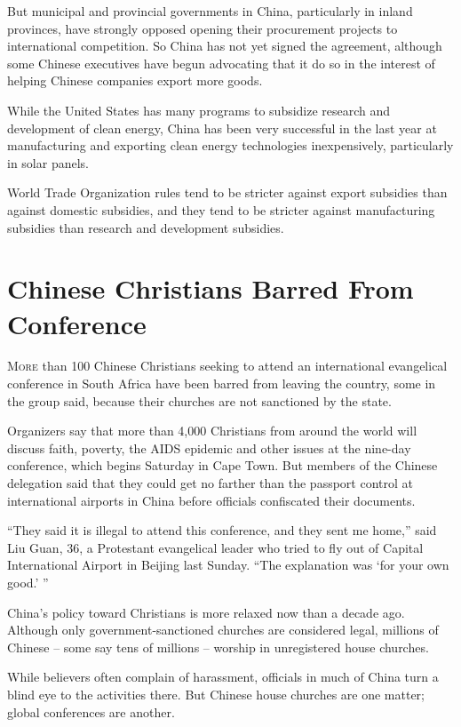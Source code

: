 ﻿\documentclass[12pt]{article}
\begin{document}
But municipal and provincial governments in China, particularly in inland provinces, have strongly
opposed opening their procurement projects to international competition. So China has not yet signed
the agreement, although some Chinese executives have begun advocating that it do so in the interest
of helping Chinese companies export more goods.

While the United States has many programs to subsidize research and development of clean energy,
China has been very successful in the last year at manufacturing and exporting clean energy
technologies inexpensively, particularly in solar panels.

World Trade Organization rules tend to be stricter against export subsidies than against domestic
subsidies, and they tend to be stricter against manufacturing subsidies than research and
development subsidies.

\section{Chinese Christians Barred From Conference}

\lettrine{M}{ore} than 100 Chinese Christians seeking to attend an
international evangelical conference in South Africa have been barred from leaving the country, some
in the group said, because their churches are not sanctioned by the state.

Organizers say that more than 4,000 Christians from around the world will discuss faith, poverty,
the AIDS epidemic and other issues at the nine-day conference, which begins Saturday in Cape Town.
But members of the Chinese delegation said that they could get no farther than the passport control
at international airports in China before officials confiscated their documents.

``They said it is illegal to attend this conference, and they sent me home,'' said Liu Guan, 36, a
Protestant evangelical leader who tried to fly out of Capital International Airport in Beijing last
Sunday. ``The explanation was `for your own good.' ''

China's policy toward Christians is more relaxed now than a decade ago. Although only
government-sanctioned churches are considered legal, millions of Chinese -- some say tens of
millions -- worship in unregistered house churches.

While believers often complain of harassment, officials in much of China turn a blind eye to the
activities there. But Chinese house churches are one matter; global conferences are another.
\end{document}
